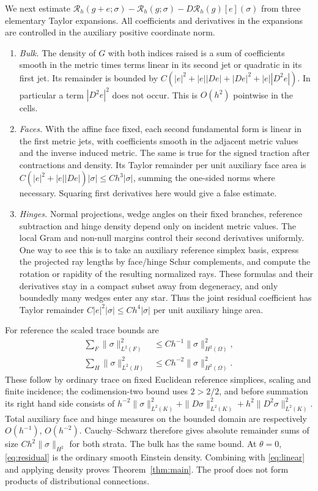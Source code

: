 \documentclass[11pt]{article}
\newcommand{\Reg}{\mathcal R}
\begin{document}
We next estimate \(\Reg_h(g+e;\sigma)-\Reg_h(g;\sigma)-D\Reg_h(g)[e](\sigma)\) from three elementary Taylor expansions. All coefficients and derivatives in the expansions are controlled in the auxiliary positive coordinate norm.
\begin{enumerate}
\item \emph{Bulk.} The density of \(G\) with both indices raised is a sum of coefficients smooth in the metric times terms linear in its second jet or quadratic in its first jet. Its remainder is bounded by \(C(|e|^2+|e||De|+|De|^2+|e||D^2e|)\). In particular a term \(|D^2e|^2\) does not occur. This is \(O(h^2)\) pointwise in the cells.
\item \emph{Faces.} With the affine face fixed, each second fundamental form is linear in the first metric jets, with coefficients smooth in the adjacent metric values and the inverse induced metric. The same is true for the signed traction after contractions and density. Its Taylor remainder per unit auxiliary face area is \(C(|e|^2+|e||De|)|\sigma|\leq C h^3|\sigma|\), summing the one-sided norms where necessary. Squaring first derivatives here would give a false estimate.
\item \emph{Hinges.} Normal projections, wedge angles on their fixed branches, reference subtraction and hinge density depend only on incident metric values. The local Gram and non-null margins control their second derivatives uniformly. One way to see this is to take an auxiliary reference simplex basis, express the projected ray lengths by face/hinge Schur complements, and compute the rotation or rapidity of the resulting normalized rays. These formulas and their derivatives stay in a compact subset away from degeneracy, and only boundedly many wedges enter any star. Thus the joint residual coefficient has Taylor remainder \(C|e|^2|\sigma|\leq Ch^4|\sigma|\) per unit auxiliary hinge area.
\end{enumerate}

For reference the scaled trace bounds are 
\begin{align*}
 \sum_F\|\sigma\|_{L^2(F)}^2&\leq C h^{-1}\|\sigma\|_{H^2(\Omega)}^2,\\
 \sum_H\|\sigma\|_{L^2(H)}^2&\leq C h^{-2}\|\sigma\|_{H^2(\Omega)}^2 .
\end{align*}
These follow by ordinary trace on fixed Euclidean reference simplices, scaling and finite incidence; the codimension-two bound uses \(2>2/2\), and before summation its right hand side consists of \(h^{-2}\|\sigma\|_{L^2(K)}^2+\|D\sigma\|_{L^2(K)}^2+h^2\|D^2\sigma\|_{L^2(K)}^2\). Total auxiliary face and hinge measures on the bounded domain are respectively \(O(h^{-1})\), \(O(h^{-2})\). Cauchy--Schwarz therefore gives absolute remainder sums of size \(C h^2\|\sigma\|_{H^2}\) for both strata. The bulk has the same bound. At \(\theta=0\), \eqref{eq:residual} is the ordinary smooth Einstein density. Combining with \eqref{eq:linear} and applying density proves Theorem~\ref{thm:main}. The proof does not form products of distributional connections.
\end{document}
